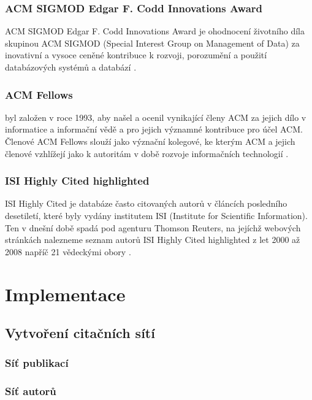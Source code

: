 \documentclass[12pt,titlepage]{report}
\begin{document}
\subsection{ACM SIGMOD Edgar F. Codd Innovations Award}
ACM SIGMOD Edgar F. Codd Innovations Award je ohodnocení životního díla
skupinou ACM SIGMOD (Special Interest Group on Management of Data)  za
inovativní a vysoce ceněné kontribuce k rozvoji, porozumění a použití
databázových systémů a databází \cite{sigmodinnovations}.

\subsection{ACM Fellows}
 byl založen v roce 1993, aby našel a ocenil
vynikající členy ACM za jejich dílo v informatice a informační vědě a pro
jejich významné kontribuce pro účel ACM. Členové ACM Fellows slouží jako
význační kolegové, ke kterým ACM a jejich členové vzhlížejí jako k autoritám v
době rozvoje informačních technologií \cite{acmfellows}.

\subsection{ISI Highly Cited highlighted}
ISI Highly Cited je databáze často citovaných autorů v článcích posledního
desetiletí, které byly vydány institutem ISI (Institute for Scientific
Information). Ten v dnešní době spadá pod agenturu Thomson Reuters, na jejíchž webových stránkách nalezneme seznam autorů ISI Highly Cited highlighted z let 2000 až 2008 napříč 21 vědeckými obory \cite{highlycited}.

\chapter{Implementace}

\section{Vytvoření citačních sítí}
\subsection{Síť publikací}
\subsection{Síť autorů}
\end{document}
